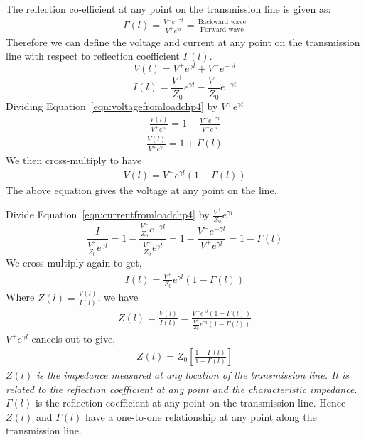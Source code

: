 The reflection co-efficient at any point on the transmission line is given as:
\begin{align*}
\Gamma{(l)} = \frac{V^-e^{-\gamma l}}{V^+e^{\gamma l}} = \frac{\text{Backward wave}}{\text{Forward wave}}
\end{align*}
Therefore we can define the voltage and current at any point on the transmission line with respect to reflection coefficient $\Gamma(l)$.
\begin{equation}
V(l) = V^+e^{\gamma l} + V^-e^{-\gamma l}\label{eqn:voltagefromloadchp4}
\end{equation}
\begin{equation}
I(l) =\frac{V^+}{Z_0} e^{\gamma l} - \frac{V^-}{Z_0}e^{-\gamma l}\label{eqn:currentfromloadchp4}
\end{equation}
Dividing Equation~\ref{eqn:voltagefromloadchp4} by $V^+e^{\gamma l}$
\begin{align*}
\frac{V(l)}{ V^+e^{\gamma l}} = 1 + \frac{ V^-e^{-\gamma l}}{ V^+e^{\gamma l}}
\end{align*}
\begin{align*}
\frac{V(l)}{ V^+e^{\gamma l}} = 1 + \Gamma(l)
\end{align*}
We then cross-multiply to have
\begin{align*}
V(l) = V^+e^{\gamma l} (1 + \Gamma(l))
\end{align*}
The above equation gives the voltage at any point on the line.

Divide Equation~\ref{eqn:currentfromloadchp4} by $\frac{V^+}{Z_0} e^{\gamma l}$
\begin{dmath*}
\frac{I}{\frac{V^+}{Z_0} e^{\gamma l}} = 1 - \frac{\frac{V^-}{Z_0} e^{-\gamma l}}{\frac{V^+}{Z_0} e^{\gamma l}}
= 1 - \frac{V^-e^{-\gamma l}}{V^+e^{\gamma l}}
= 1 - \Gamma(l)
\end{dmath*}
We cross-multiply again to get,
\begin{align*}
I(l) = \frac{V^+}{Z_0} e^{\gamma l} (1 - \Gamma(l))
\end{align*}
Where $Z(l) = \frac{V(l)}{I(l)}$, we have
\begin{align*}
Z(l) = \frac{V(l)}{I(l)} = \frac{V^+e^{\gamma l} (1 + \Gamma(l))}{ \frac{V^+}{Z_0} e^{\gamma l} (1 - \Gamma(l))}
\end{align*}
$V^+ e^{\gamma l}$ cancels out to give,
\begin{align}
Z(l) = Z_0\left[\frac{1 + \Gamma(l)}{1 - \Gamma(l)}\right]
\end{align}
$Z(l)$ \emph{is the impedance measured at any location of the transmission line. It is related to the reflection coefficient at any point and the characteristic impedance}. $\Gamma(l)$ is the reflection coefficient at any point on the transmission line. Hence $Z(l)$ and $\Gamma(l)$ have a one-to-one relationship at any point along the transmission line.

